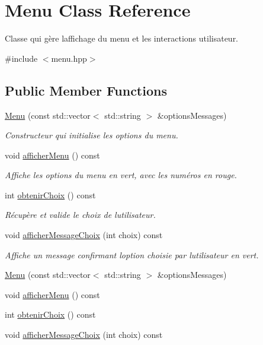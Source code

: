 \hypertarget{classMenu}{}\section{Menu Class Reference}
\label{classMenu}


Classe qui gère l\textquotesingle{}affichage du menu et les interactions utilisateur.  




{\ttfamily \#include $<$menu.\+hpp$>$}

\subsection*{Public Member Functions}
\begin{DoxyCompactItemize}
\item 
\hyperlink{classMenu_a08614e9db9f4da4c6bcd37887d3df51a}{Menu} (const std\+::vector$<$ std\+::string $>$ \&options\+Messages)
\begin{DoxyCompactList}\small\item\em Constructeur qui initialise les options du menu. \end{DoxyCompactList}\item 
void \hyperlink{classMenu_a27c166b79b757c245c6183ee8dd5cf2a}{afficher\+Menu} () const
\begin{DoxyCompactList}\small\item\em Affiche les options du menu en vert, avec les numéros en rouge. \end{DoxyCompactList}\item 
int \hyperlink{classMenu_a7a46776577f8cba63999b1bbe85576ed}{obtenir\+Choix} () const
\begin{DoxyCompactList}\small\item\em Récupère et valide le choix de l\textquotesingle{}utilisateur. \end{DoxyCompactList}\item 
void \hyperlink{classMenu_a16172e4478222f6843e25bb522052c36}{afficher\+Message\+Choix} (int choix) const
\begin{DoxyCompactList}\small\item\em Affiche un message confirmant l\textquotesingle{}option choisie par l\textquotesingle{}utilisateur en vert. \end{DoxyCompactList}\item 
\hyperlink{classMenu_a08614e9db9f4da4c6bcd37887d3df51a}{Menu} (const std\+::vector$<$ std\+::string $>$ \&options\+Messages)
\item 
void \hyperlink{classMenu_a27c166b79b757c245c6183ee8dd5cf2a}{afficher\+Menu} () const
\item 
int \hyperlink{classMenu_a7a46776577f8cba63999b1bbe85576ed}{obtenir\+Choix} () const
\item 
void \hyperlink{classMenu_a16172e4478222f6843e25bb522052c36}{afficher\+Message\+Choix} (int choix) const
\end{DoxyCompactItemize}


